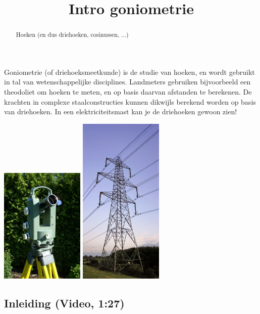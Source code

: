\documentclass{ximera}
\title[Examples:]{Intro goniometrie}
\begin{document}
\begin{abstract}
	Hoeken (en dus driehoeken, cosinussen, ...)
\end{abstract}
\maketitle


Goniometrie (of driehoeksmeetkunde) is de studie van hoeken, en wordt gebruikt in tal van wetenschappelijke disciplines. Landmeters gebruiken bijvoorbeeld een theodoliet om hoeken te meten, en op basis daarvan afstanden te berekenen. De krachten in complexe staalconstructies  kunnen dikwijls berekend worden op basis van driehoeken. In een elektriciteitsmast kan je de driehoeken gewoon zien!

\begin{center}
\begin{image}
	\includegraphics[width=0.3\textwidth]{Askania_Sekunden-Theodolit_TU_e_400.jpg}\quad
	\includegraphics[width=0.3\textwidth]{Pylon_ds.jpg}
\end{image}
\end{center}


\subsection{Inleiding (Video, 1:27)}
\begin{expandable}
 \begin{center}
 \end{center}
\end{expandable}
\end{document}
